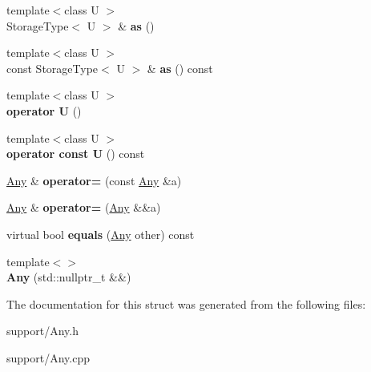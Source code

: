 \begin{DoxyCompactItemize}
\item 
\mbox{\label{structantlrcpp_1_1Any_a1601333b7a6f2946c6a9574b4c048bb9}} 
{\footnotesize template$<$class U $>$ }\\Storage\+Type$<$ U $>$ \& {\bfseries as} ()
\item 
\mbox{\label{structantlrcpp_1_1Any_a0ea0d91dadd5bd8040658cdc884bf9bd}} 
{\footnotesize template$<$class U $>$ }\\const Storage\+Type$<$ U $>$ \& {\bfseries as} () const
\item 
\mbox{\label{structantlrcpp_1_1Any_aab7d8365f55c4e7cf4def8cd8269bd14}} 
{\footnotesize template$<$class U $>$ }\\{\bfseries operator U} ()
\item 
\mbox{\label{structantlrcpp_1_1Any_a1ebc4907fe9223aa53e3f4e7bd607348}} 
{\footnotesize template$<$class U $>$ }\\{\bfseries operator const U} () const
\item 
\mbox{\label{structantlrcpp_1_1Any_afa77070ae510acee16b1f436d980eba1}} 
\hyperlink{structantlrcpp_1_1Any}{Any} \& {\bfseries operator=} (const \hyperlink{structantlrcpp_1_1Any}{Any} \&a)
\item 
\mbox{\label{structantlrcpp_1_1Any_ad55ba3224403ad653cc15db65affecee}} 
\hyperlink{structantlrcpp_1_1Any}{Any} \& {\bfseries operator=} (\hyperlink{structantlrcpp_1_1Any}{Any} \&\&a)
\item 
\mbox{\label{structantlrcpp_1_1Any_ac0a7c61a73fd051336e187d2b962f191}} 
virtual bool {\bfseries equals} (\hyperlink{structantlrcpp_1_1Any}{Any} other) const
\item 
\mbox{\label{structantlrcpp_1_1Any_a797391c886a18b95dbe5a9ab8eba6e34}} 
{\footnotesize template$<$$>$ }\\{\bfseries Any} (std\+::nullptr\+\_\+t \&\&)
\end{DoxyCompactItemize}


The documentation for this struct was generated from the following files\+:\begin{DoxyCompactItemize}
\item 
support/Any.\+h\item 
support/Any.\+cpp\end{DoxyCompactItemize}

